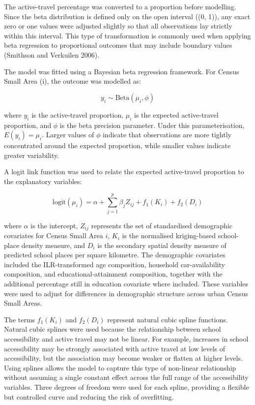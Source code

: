 \documentclass{article}
\begin{document}
The active-travel percentage was converted to a proportion before
modelling. Since the beta distribution is defined only on the open
interval ((0, 1)), any exact zero or one values were adjusted slightly
so that all observations lay strictly within this interval. This type of
transformation is commonly used when applying beta regression to
proportional outcomes that may include boundary values (Smithson and
Verkuilen 2006).

The model was fitted using a Bayesian beta regression framework. For
Census Small Area (i), the outcome was modelled as:

\[
y_i \sim \mathrm{Beta}(\mu_i, \phi)
\]

where \(y_i\) is the active-travel proportion, \(\mu_i\) is the expected
active-travel proportion, and \(\phi\) is the beta precision parameter.
Under this parameterisation, \(E(y_i) = \mu_i\). Larger values of
\(\phi\) indicate that observations are more tightly concentrated around
the expected proportion, while smaller values indicate greater
variability.

A logit link function was used to relate the expected active-travel
proportion to the explanatory variables:

\[
\mathrm{logit}(\mu_i) =
\alpha +
\sum_{j=1}^{p} \beta_j Z_{ij}
+
f_1(K_i)
+
f_2(D_i)
\]

where \(\alpha\) is the intercept, \(Z_{ij}\) represents the set of
standardised demographic covariates for Census Small Area \(i\), \(K_i\)
is the normalised kriging-based school-place density measure, and
\(D_i\) is the secondary spatial density measure of predicted school
places per square kilometre. The demographic covariates included the
ILR-transformed age composition, household car-availability composition,
and educational-attainment composition, together with the additional
percentage still in education covariate where included. These variables
were used to adjust for differences in demographic structure across
urban Census Small Areas.

The terms \(f_1(K_i)\) and \(f_2(D_i)\) represent natural cubic spline
functions. Natural cubic splines were used because the relationship
between school accessibility and active travel may not be linear. For
example, increases in school accessibility may be strongly associated
with active travel at low levels of accessibility, but the association
may become weaker or flatten at higher levels. Using splines allows the
model to capture this type of non-linear relationship without assuming a
single constant effect across the full range of the accessibility
variables. Three degrees of freedom were used for each spline, providing
a flexible but controlled curve and reducing the risk of overfitting.
\end{document}
